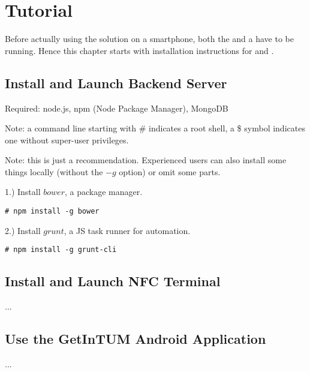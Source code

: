 \section{Tutorial}\label{sec:tutorial}

Before actually using the \app solution on a smartphone, both the \be and a \ter have to be running.
Hence this chapter starts with installation instructions for \be and \ter.

\subsection{Install and Launch Backend Server}

Required: node.js, npm (Node Package Manager), MongoDB

Note: a command line starting with \# indicates a root shell, a \$ symbol indicates one without super-user privileges.

Note: this is just a recommendation. Experienced users can also install some things locally (without the $-g$ option) or omit some parts.


1.) Install $bower$, a package manager.
\begin{lstlisting}
# npm install -g bower
\end{lstlisting}
2.) Install $grunt$, a JS task runner for automation.
\begin{lstlisting}
# npm install -g grunt-cli
\end{lstlisting}

\subsection{Install and Launch NFC Terminal}

...

\subsection{Use the GetInTUM Android Application}

...



\iffalse
\bigskip
\begin{lstlisting}
# npm install -g bower
# npm install -g grunt-cli
# npm install -g vows		(optional; runs unit tests)
$ npm install
\end{lstlisting}
\bigskip

\fi